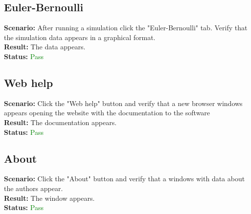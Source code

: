 \documentclass[a4paper, 11pt, article]{report}
\begin{document}
\subsection{Euler-Bernoulli}

\noindent \textbf{Scenario:} After running a simulation click the "Euler-Bernoulli" tab. Verify that the simulation data appears in a graphical format.
\\
\noindent \textbf{Result:} The data appears.
\\
\noindent \textbf{Status:} \textcolor{green}{Pass}

\subsection{Web help}

\noindent \textbf{Scenario:} Click the "Web help" button and verify that a new browser windows appears opening the website with the documentation to the software
\\
\noindent \textbf{Result:} The documentation appears.
\\
\noindent \textbf{Status:} \textcolor{green}{Pass}

\subsection{About}

\noindent \textbf{Scenario:} Click the "About" button and verify that a windows with data about the authors appear.
\\
\noindent \textbf{Result:} The window appears.
\\
\noindent \textbf{Status:} \textcolor{green}{Pass}

\end{document}
